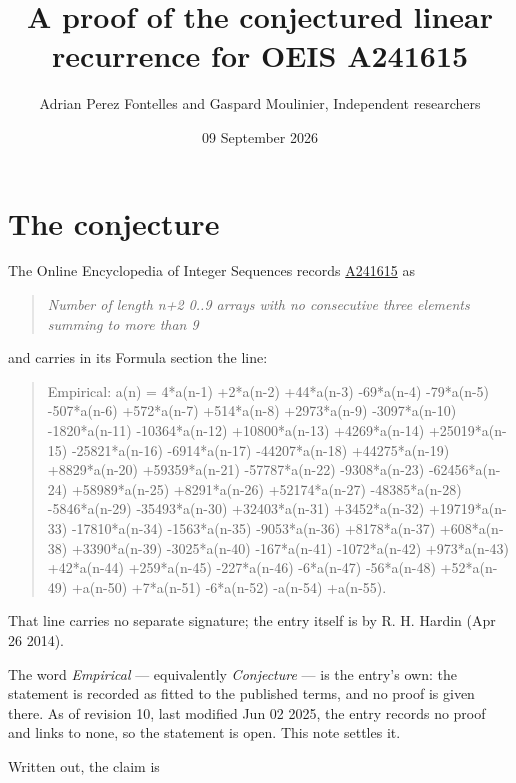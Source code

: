 \documentclass[11pt]{article}
\title{A proof of the conjectured linear recurrence for OEIS A241615}
\author{Adrian Perez Fontelles and Gaspard Moulinier, Independent researchers}
\date{09 September 2026}
\theoremstyle{definition}
\begin{document}
\maketitle
\section{The conjecture}

The Online Encyclopedia of Integer Sequences records \href{https://oeis.org/A241615}{A241615} as

\begin{quote}\itshape Number of length n+2 0..9 arrays with no consecutive three elements summing to more than 9\end{quote}

and carries in its Formula section the line:

\begin{quote}\ttfamily Empirical: a(n) = 4*a(n-1) +2*a(n-2) +44*a(n-3) -69*a(n-4) -79*a(n-5) -507*a(n-6) +572*a(n-7) +514*a(n-8) +2973*a(n-9) -3097*a(n-10) -1820*a(n-11) -10364*a(n-12) +10800*a(n-13) +4269*a(n-14) +25019*a(n-15) -25821*a(n-16) -6914*a(n-17) -44207*a(n-18) +44275*a(n-19) +8829*a(n-20) +59359*a(n-21) -57787*a(n-22) -9308*a(n-23) -62456*a(n-24) +58989*a(n-25) +8291*a(n-26) +52174*a(n-27) -48385*a(n-28) -5846*a(n-29) -35493*a(n-30) +32403*a(n-31) +3452*a(n-32) +19719*a(n-33) -17810*a(n-34) -1563*a(n-35) -9053*a(n-36) +8178*a(n-37) +608*a(n-38) +3390*a(n-39) -3025*a(n-40) -167*a(n-41) -1072*a(n-42) +973*a(n-43) +42*a(n-44) +259*a(n-45) -227*a(n-46) -6*a(n-47) -56*a(n-48) +52*a(n-49) +a(n-50) +7*a(n-51) -6*a(n-52) -a(n-54) +a(n-55).\end{quote}

That line carries no separate signature; the entry itself is by R. H. Hardin (Apr 26 2014).

The word {\itshape Empirical} --- equivalently {\itshape Conjecture} --- is the entry's own: the statement is recorded as fitted to the published terms, and no proof is given there. As of revision 10, last modified Jun 02 2025, the entry records no proof and links to none, so the statement is open. This note settles it.

Written out, the claim is
\end{document}
